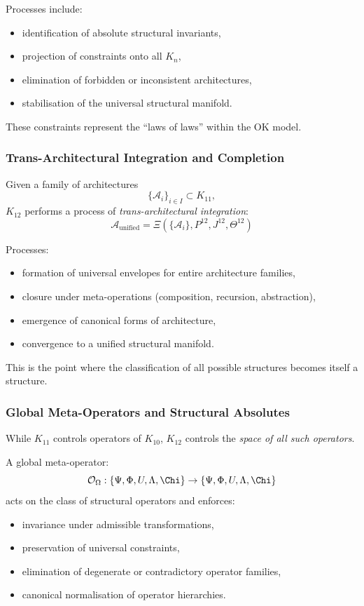 Processes include:
\begin{itemize}
    \item identification of absolute structural invariants,
    \item projection of constraints onto all $K_n$,
    \item elimination of forbidden or inconsistent architectures,
    \item stabilisation of the universal structural manifold.
\end{itemize}

These constraints represent the ``laws of laws'' within the OK model.

\subsubsection{Trans-Architectural Integration and Completion}

Given a family of architectures
\[
\{\mathcal{A}_i\}_{i \in I} \subset K_{11},
\]
$K_{12}$ performs a process of \emph{trans-architectural integration}:
\[
\mathcal{A}_{\text{unified}} 
= \Xi(\{\mathcal{A}_i\}, P^{12}, J^{12}, \Theta^{12})
\]

Processes:
\begin{itemize}
    \item formation of universal envelopes for entire architecture families,
    \item closure under meta-operations (composition, recursion, abstraction),
    \item emergence of canonical forms of architecture,
    \item convergence to a unified structural manifold.
\end{itemize}

This is the point where the classification of all possible structures becomes itself a structure.

\subsubsection{Global Meta-Operators and Structural Absolutes}

While $K_{11}$ controls operators of $K_{10}$,
$K_{12}$ controls the \emph{space of all such operators}.

A global meta-operator:
\[
\mathcal{O}_{\Omega} : \{\Psi, \Phi, U, \Lambda, \Chi\} \to 
            \{\Psi, \Phi, U, \Lambda, \Chi\}
\]
acts on the class of structural operators and enforces:
\begin{itemize}
    \item invariance under admissible transformations,
    \item preservation of universal constraints,
    \item elimination of degenerate or contradictory operator families,
    \item canonical normalisation of operator hierarchies.
\end{itemize}

